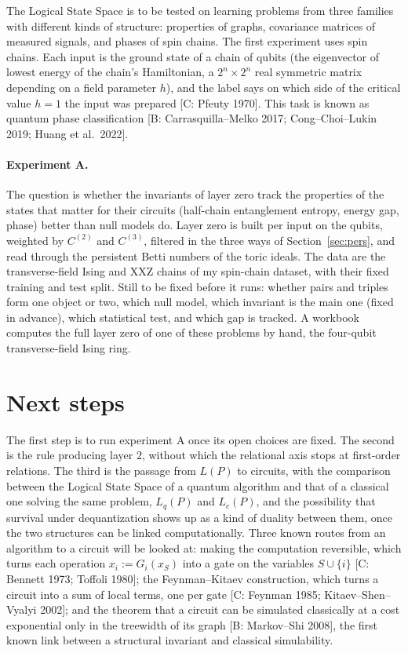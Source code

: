 \documentclass[11pt,a4paper]{article}
\newcommand{\gr}[1]{\textsf{[#1]}}
\begin{document}
The Logical State Space is to be tested on learning problems from three families with different kinds of structure: properties of graphs, covariance matrices of measured signals, and phases of spin chains. The first experiment uses spin chains. Each input is the ground state of a chain of qubits (the eigenvector of lowest energy of the chain's Hamiltonian, a $2^n\times2^n$ real symmetric matrix depending on a field parameter $h$), and the label says on which side of the critical value $h=1$ the input was prepared \gr{C: Pfeuty 1970}. This task is known as quantum phase classification \gr{B: Carrasquilla--Melko 2017; Cong--Choi--Lukin 2019; Huang et al.\ 2022}.

\paragraph{Experiment A.} The question is whether the invariants of layer zero track the properties of the states that matter for their circuits (half-chain entanglement entropy, energy gap, phase) better than null models do. Layer zero is built per input on the qubits, weighted by $C^{(2)}$ and $C^{(3)}$, filtered in the three ways of Section~\ref{sec:pers}, and read through the persistent Betti numbers of the toric ideals. The data are the transverse-field Ising and XXZ chains of my spin-chain dataset, with their fixed training and test split. Still to be fixed before it runs: whether pairs and triples form one object or two, which null model, which invariant is the main one (fixed in advance), which statistical test, and which gap is tracked. A workbook computes the full layer zero of one of these problems by hand, the four-qubit transverse-field Ising ring.

\section{Next steps}\label{sec:next}

The first step is to run experiment A once its open choices are fixed. The second is the rule producing layer $2$, without which the relational axis stops at first-order relations. The third is the passage from $L(P)$ to circuits, with the comparison between the Logical State Space of a quantum algorithm and that of a classical one solving the same problem, $L_q(P)$ and $L_c(P)$, and the possibility that survival under dequantization shows up as a kind of duality between them, once the two structures can be linked computationally. Three known routes from an algorithm to a circuit will be looked at: making the computation reversible, which turns each operation $x_i:=G_i(x_S)$ into a gate on the variables $S\cup\{i\}$ \gr{C: Bennett 1973; Toffoli 1980}; the Feynman--Kitaev construction, which turns a circuit into a sum of local terms, one per gate \gr{C: Feynman 1985; Kitaev--Shen--Vyalyi 2002}; and the theorem that a circuit can be simulated classically at a cost exponential only in the treewidth of its graph \gr{B: Markov--Shi 2008}, the first known link between a structural invariant and classical simulability.
\end{document}
